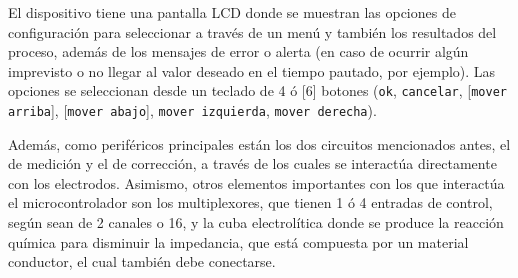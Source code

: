 El dispositivo tiene una pantalla LCD donde se muestran las opciones de configuración para seleccionar a través de un menú y también los resultados del proceso, además de los mensajes de error o alerta (en caso de ocurrir algún imprevisto o no llegar al valor deseado en el tiempo pautado, por ejemplo). Las opciones se seleccionan desde un teclado de 4 ó [6] botones (\texttt{ok}, \texttt{cancelar}, [\texttt{mover arriba}], [\texttt{mover abajo}], \texttt{mover izquierda}, \texttt{mover derecha}).

Además, como periféricos principales están los dos circuitos mencionados antes, el de medición y el de corrección, a través de los cuales se interactúa directamente con los electrodos. Asimismo, otros elementos importantes con los que interactúa el microcontrolador son los multiplexores, que tienen 1 ó 4 entradas de control, según sean de 2 canales o 16, y la cuba electrolítica donde se produce la reacción química para disminuir la impedancia, que está compuesta por un material conductor, el cual también debe conectarse.



